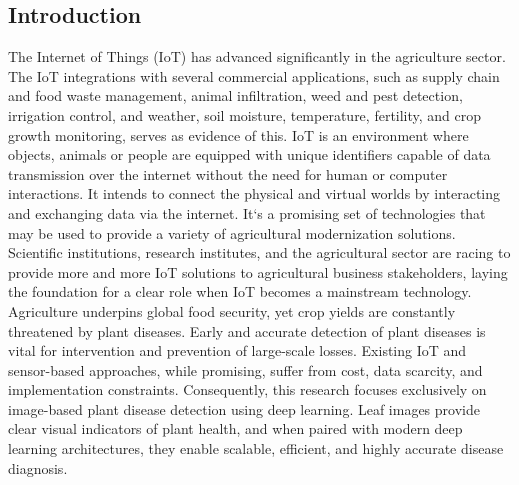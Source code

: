 \documentclass[12pt,a4paper]{report}
\begin{document}
\begin{List of Abbreviations}
\chapter{Introduction}
The Internet of Things (IoT) has advanced significantly in the agriculture sector. The IoT integrations with several commercial applications, such as supply chain and food waste management, animal infiltration, weed and pest detection, irrigation control, and weather, soil moisture, temperature, fertility, and crop growth monitoring, serves as evidence of this. IoT is an environment where objects, animals or people are equipped with unique identifiers capable of data transmission over the internet without the need for human or computer interactions. It intends to connect the physical and virtual worlds by interacting and exchanging data via the internet. It`s a promising set of technologies that may be used to provide a variety of agricultural modernization solutions. Scientific institutions, research institutes, and the agricultural sector are racing to provide more and more IoT solutions to agricultural business stakeholders, laying the foundation for a clear role when IoT becomes a mainstream technology.
Agriculture underpins global food security, yet crop yields are constantly threatened by plant diseases. Early and accurate detection of plant diseases is vital for intervention and prevention of large-scale losses. Existing IoT and sensor-based approaches, while promising, suffer from cost, data scarcity, and implementation constraints. Consequently, this research focuses exclusively on image-based plant disease detection using deep learning. Leaf images provide clear visual indicators of plant health, and when paired with modern deep learning architectures, they enable scalable, efficient, and highly accurate disease diagnosis.


\end{List of Abbreviations}
\end{document}
